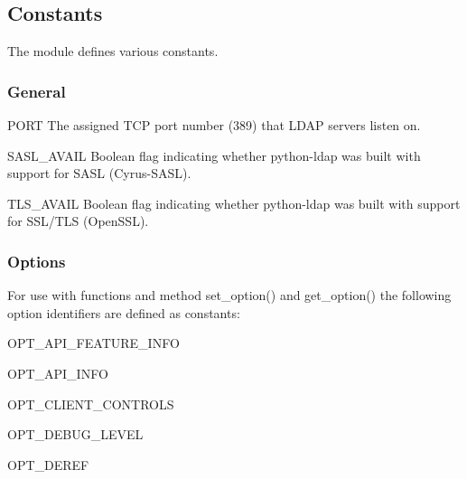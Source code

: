 
\subsection{Constants}

The module defines various constants.

\subsubsection{General}

\begin{datadesc}{PORT}
  The assigned TCP port number (389) that LDAP servers listen on.
\end{datadesc}

\begin{datadesc}{SASL_AVAIL}
  Boolean flag indicating whether python-ldap was built
  with support for SASL (Cyrus-SASL).
\end{datadesc}

\begin{datadesc}{TLS_AVAIL}
  Boolean flag indicating whether python-ldap was built
  with support for SSL/TLS (OpenSSL).
\end{datadesc}

\subsubsection{Options}

For use with functions and method set_option() and get_option() the
following option identifiers are defined as constants:

\begin{datadesc}{OPT_API_FEATURE_INFO}
\end{datadesc}

\begin{datadesc}{OPT_API_INFO}
\end{datadesc}

\begin{datadesc}{OPT_CLIENT_CONTROLS}
\end{datadesc}

\begin{datadesc}{OPT_DEBUG_LEVEL}
\end{datadesc}

\begin{datadesc}{OPT_DEREF}
\end{datadesc}

